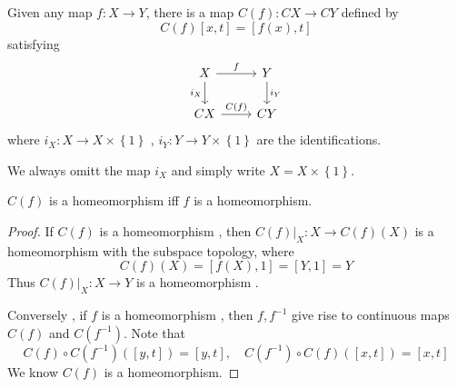 \documentclass[../main.tex]{subfiles}
\begin{document}
\begin{definition}{}{}
    Given any map \(  f:X\to Y  \), there is a map \(  C\left( f \right):CX\to CY   \) defined by \[
     C\left( f \right)\left[ x,t \right]= \left[ f\left( x \right),t  \right]  
    \]satisfying \[
\begin{tikzcd}
    X \arrow[r, "f"] \arrow[d, "i_X"'] & Y \arrow[d, "i_Y"] \\
    CX \arrow[r, "C(f)"] & CY
\end{tikzcd}
\] where \(  i_{X}: X\to X\times \left\{ 1 \right\}  \) , \(  i_{Y}: Y\to Y\times \left\{ 1 \right\}  \) are the identifications. 
\end{definition}

\begin{remark}
    We always omitt the map \(  i_{X}  \) and simply write \(  X= X\times \left\{ 1 \right\}  \).  
\end{remark}

\begin{proposition}{}{}
    \(  C\left( f \right)   \) is a homeomorphism iff \(  f  \) is a homeomorphism.  
\end{proposition}
\begin{proof}
    If \(  C\left( f \right)   \) is a homeomorphism , then \(  C\left( f \right)|_{X}: X\to C\left( f \right)\left( X \right)     \)   is a homeomorphism with the subspace topology, where \[
    C\left( f \right)\left( X \right)= \left[ f\left( X \right),1  \right]= \left[ Y,1 \right]= Y    
    \]Thus \(  C\left( f \right)|_{X}:X\to Y   \) is a homeomorphism .

    Conversely , if \(  f  \) is a homeomorphism , then \(  f, f^{-1}   \) give rise to   continuous maps \(  C\left( f \right)   \) and \(  C\left( f^{-1}  \right)   \). Note that \[
    C\left( f \right)\circ C\left( f^{-1}  \right)\left( [y,t] \right)= [y,t],\quad C\left( f^{-1}  \right)\circ C\left( f \right)\left( [x,t] \right)= [x,t]      
    \]  We know \(  C\left( f \right)   \) is a homeomorphism. 
\end{proof}
\end{document}

